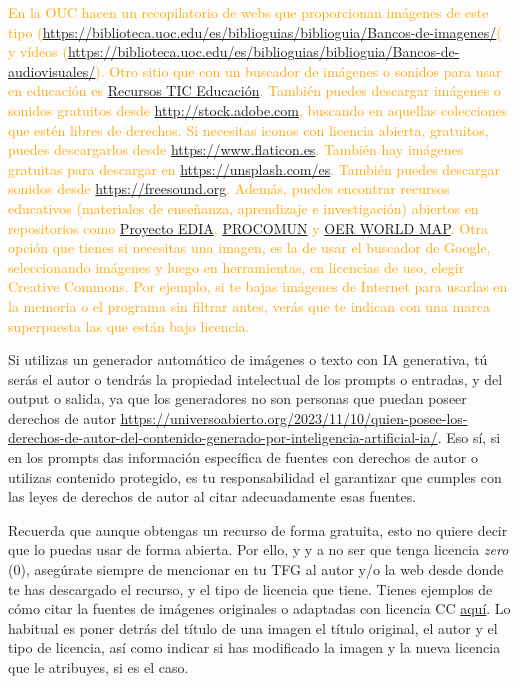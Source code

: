 \begin{naranja}
\textcolor{orange}{
En la OUC hacen un recopilatorio de webs que proporcionan imágenes de este tipo (\url{https://biblioteca.uoc.edu/es/biblioguias/biblioguia/Bancos-de-imagenes/}( y vídeos (\url{https://biblioteca.uoc.edu/es/biblioguias/biblioguia/Bancos-de-audiovisuales/}). Otro sitio que con un buscador de imágenes o sonidos para usar en educación es \href{http://recursostic.educacion.es}{Recursos TIC Educación}. También puedes descargar imágenes o sonidos gratuitos desde \url{http://stock.adobe.com}, buscando en aquellas colecciones que estén libres de derechos. Si necesitas iconos con licencia abierta, gratuitos, puedes descargarlos desde \url{https://www.flaticon.es}. También hay imágenes gratuitas para descargar en \url{https://unsplash.com/es}.
También puedes descargar sonidos desde \url{https://freesound.org}. Además, puedes encontrar recursos educativos  (materiales de enseñanza, aprendizaje e investigación) abiertos en repositorios como \href{cedec.intef.es}{Proyecto EDIA}, \href{procomun.educalab.es}{PROCOMUN} y \href{oerworldmap.org}{OER WORLD MAP}. 
}
\textcolor{orange}{
Otra opción que tienes si necesitas una imagen, es la de usar el buscador de Google, seleccionando imágenes y luego en herramientas, en licencias de uso, elegir Creative Commons. Por ejemplo, si te bajas imágenes de Internet para usarlas en la memoria o el programa sin filtrar antes, verás que te indican con una marca superpuesta las que están bajo licencia. 
}

Si utilizas un generador automático de imágenes o texto con IA generativa, tú serás el autor o tendrás la propiedad intelectual de los prompts o entradas, y del output o salida, ya que los generadores no son personas que puedan poseer derechos de autor \url{https://universoabierto.org/2023/11/10/quien-posee-los-derechos-de-autor-del-contenido-generado-por-inteligencia-artificial-ia/}. Eso sí, si en los prompts das información específica de fuentes con derechos de autor o utilizas contenido protegido, es tu responsabilidad el garantizar que cumples con las leyes de derechos de autor al citar adecuadamente esas fuentes.

Recuerda que aunque obtengas un recurso de forma gratuita, esto no quiere decir que lo puedas usar de forma abierta. Por ello, y y a no ser que tenga licencia \textit{zero} (0), asegúrate siempre de mencionar en tu TFG al autor y/o la web desde donde te has descargado el recurso, y el tipo de licencia que tiene. Tienes ejemplos de cómo citar la fuentes de imágenes originales o adaptadas con licencia CC \href{https://wiki.creativecommons.org/wiki/Recommended_practices_for_attribution}{aquí}. Lo habitual es poner detrás del título de una imagen el título original, el autor y el tipo de licencia, así como indicar si has modificado la imagen y la nueva licencia que le atribuyes, si es el caso.


\end{naranja}
